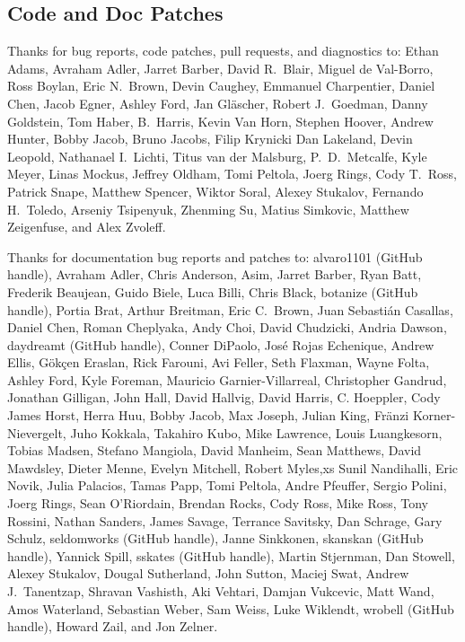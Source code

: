 \subsection*{Code  and Doc Patches}

Thanks for bug reports, code patches, pull requests, and diagnostics
to:
Ethan Adams,
Avraham Adler,
Jarret Barber, 
David R.~Blair,
Miguel de Val-Borro, 
Ross Boylan, 
Eric N.~Brown, 
Devin Caughey, 
Emmanuel Charpentier,
Daniel Chen,
Jacob Egner,
Ashley Ford,
Jan Gl\"ascher,
Robert J.\ Goedman,
Danny Goldstein,
Tom Haber,
B.~Harris,
Kevin Van Horn,
Stephen Hoover,
Andrew Hunter,
Bobby Jacob,
Bruno Jacobs,
Filip Krynicki
Dan Lakeland,
Devin Leopold,
Nathanael I.~Lichti,
Titus van der Malsburg,
P.~D.~Metcalfe,
Kyle Meyer,
Linas Mockus,
Jeffrey Oldham,
Tomi Peltola,
Joerg Rings,
Cody T.\ Ross,
Patrick Snape,
Matthew Spencer,
Wiktor Soral,
Alexey Stukalov,
Fernando H.~Toledo,
Arseniy Tsipenyuk,
Zhenming Su,
Matius Simkovic,
Matthew Zeigenfuse,
and
Alex Zvoleff.

Thanks for documentation bug reports and patches to:
alvaro1101 (GitHub handle),
Avraham Adler,
Chris Anderson,
Asim,
Jarret Barber,
Ryan Batt,
Frederik Beaujean,
Guido Biele,
Luca Billi,
Chris Black,
botanize (GitHub handle),
Portia Brat,
Arthur Breitman,
Eric C.~Brown,
Juan Sebasti\'an Casallas,
Daniel Chen,
Roman Cheplyaka,
Andy Choi, 
David Chudzicki,
Andria Dawson,
daydreamt (GitHub handle),
Conner DiPaolo,
Jos\'{e} Rojas Echenique,
Andrew Ellis,
G\"{o}k\c{c}en Eraslan,
Rick Farouni,
Avi Feller,
Seth Flaxman,
Wayne Folta,
Ashley Ford,
Kyle Foreman,
Mauricio Garnier-Villarreal,
Christopher Gandrud,
Jonathan Gilligan,
John Hall,
David Hallvig,
David Harris,
C. Hoeppler,
Cody James Horst,
Herra Huu,
Bobby Jacob,
Max Joseph,
Julian King,
Fr\"anzi Korner-Nievergelt,
Juho Kokkala,
Takahiro Kubo,
Mike Lawrence,
Louis Luangkesorn,
Tobias Madsen,
Stefano Mangiola,
David Manheim,
Sean Matthews,
David Mawdsley,
Dieter Menne,
Evelyn Mitchell,
Robert Myles,xs
Sunil Nandihalli,
Eric Novik,
Julia Palacios,
Tamas Papp, 
Tomi Peltola,
Andre Pfeuffer,
Sergio Polini,
Joerg Rings,
Sean O'Riordain,
Brendan Rocks,
Cody Ross,
Mike Ross,
Tony Rossini,
Nathan Sanders,
James Savage,
Terrance Savitsky,
Dan Schrage,
Gary Schulz,
seldomworks (GitHub handle),
Janne Sinkkonen,
skanskan (GitHub handle),
Yannick Spill,
sskates (GitHub handle),
Martin Stjernman,
Dan Stowell,
Alexey Stukalov,
Dougal Sutherland,
John Sutton,
Maciej Swat,
Andrew J.~Tanentzap,
Shravan Vashisth,
Aki Vehtari,
Damjan Vukcevic,
Matt Wand,
Amos Waterland,
Sebastian Weber,
Sam Weiss,
Luke Wiklendt,
wrobell (GitHub handle),
Howard Zail, and
Jon Zelner.

